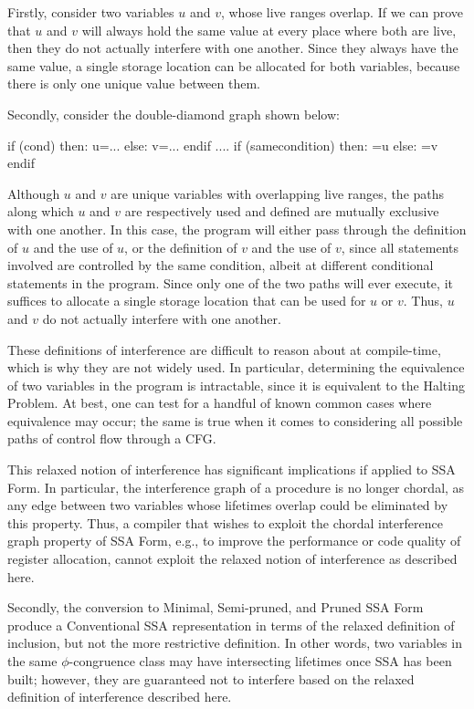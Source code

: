 Firstly, consider two variables $u$ and $v$, whose live ranges overlap.
If we can prove that $u$ and $v$ will always hold the same value
at every place where both are live, then they do not actually interfere
with one another. Since they always have the same value, a single 
storage location can be allocated for both variables, because there
is only one unique value between them.

Secondly, consider the double-diamond graph shown below:

if (cond) then:
u=...
else:
v=...
endif
....
if (samecondition) then:
 =u
else:
 =v
endif

Although $u$ and $v$ are unique variables with overlapping live
ranges, the paths along which $u$ and $v$ are respectively used and
defined are mutually exclusive with one another. In this case, the
program will either pass through the definition of $u$ and the use
of $u$, or the definition of $v$ and the use of $v$, since all
statements involved are controlled by the same condition, albeit
at different conditional statements in the program. Since only
one of the two paths will ever execute, it suffices to allocate a 
single storage location that can be used for $u$ or $v$. Thus, $u$
and $v$ do not actually interfere with one another. 
 
These definitions of interference are difficult to reason about at 
compile-time, which is why they are not widely used. In particular,
determining the equivalence of two variables in the program is
intractable, since it is equivalent to the Halting Problem. At best,
one can test for a handful of known common cases where 
equivalence may occur; the same is true when it comes to considering
all possible paths of control flow through a CFG. 

This relaxed notion of interference has significant implications if
applied to SSA Form. In particular, the interference graph of a procedure
is no longer chordal, as any edge between two variables whose lifetimes
overlap could be eliminated by this property. Thus, a compiler that
wishes to exploit the chordal interference graph property of SSA Form, 
e.g., to improve the performance or code quality of register allocation,
cannot exploit the relaxed notion of interference as described here.

Secondly, the conversion to Minimal, Semi-pruned, and Pruned SSA Form
produce a Conventional SSA representation in terms of the relaxed 
definition of inclusion, but not the more restrictive definition. In other
words, two variables in the same $\phi$-congruence class may have 
intersecting lifetimes once SSA has been built; however, they are
guaranteed not to interfere based on the relaxed definition
of interference described here. 





